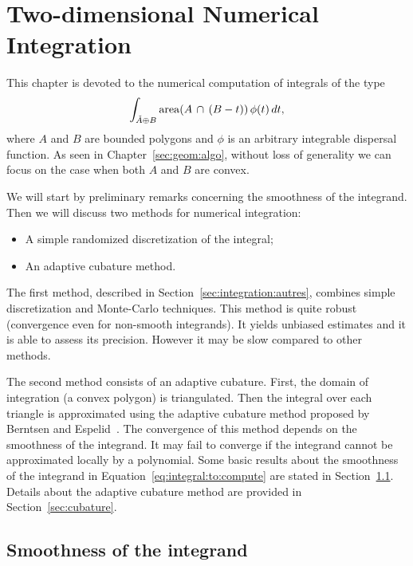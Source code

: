 
\chapter{Two-dimensional Numerical Integration}
\label{sec:integrale}

This chapter is devoted to the numerical computation of integrals of
the type
\begin{equation}
  \label{eq:integral:to:compute}
  \int_{\check{A}\oplus B} \mathrm{area}(A\,\cap\,(B-t)) \,\phi(t)
  \,dt,
\end{equation}
where $A$ and $B$ are bounded polygons and $\phi$ is an arbitrary
integrable dispersal function. As seen in
Chapter~\ref{sec:geom:algo}, without loss of generality we can focus
on the case when both $A$ and $B$ are convex.

We will start by preliminary remarks concerning the smoothness of the
integrand. Then we will discuss two methods for numerical integration:
\begin{itemize}
\item A simple randomized discretization of the integral;
\item An adaptive cubature method.
\end{itemize}

The first method, described in Section~\ref{sec:integration:autres},
combines simple discretization and Monte-Carlo techniques. This method
is quite robust (convergence even for non-smooth integrands). It
yields unbiased estimates and it is able to assess its precision.
However it may be slow compared to other methods.

The second method consists of an adaptive cubature. First, the domain of
integration (a convex polygon) is triangulated. Then the integral over
each triangle is approximated using the adaptive cubature method
proposed by Berntsen and Espelid~\cite{berntsen_espelid}. The
convergence of this method depends on the smoothness of the
integrand. It may fail to converge if the integrand cannot be
approximated locally by a polynomial. Some basic results about the
smoothness of the integrand in Equation~\eqref{eq:integral:to:compute}
are stated in Section~\ref{sec:regularite}. Details about the
adaptive cubature method are provided in Section~\ref{sec:cubature}.


\section{Smoothness of the integrand}
\label{sec:regularite}

